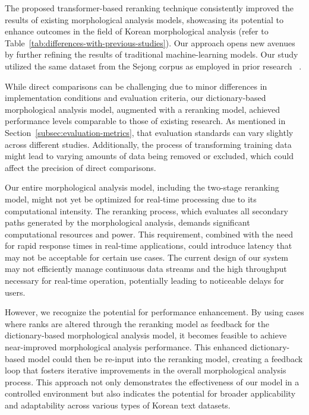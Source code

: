 \documentclass[AMS,STIX2COL]{WileyNJD-v2}
\begin{document}
    The proposed transformer-based reranking technique consistently improved the results of existing morphological analysis models, showcasing its potential to enhance outcomes in the field of Korean morphological analysis (refer to Table~\ref{tab:differences-with-previous-studies}).
    Our approach opens new avenues by further refining the results of traditional machine-learning models.
    Our study utilized the same dataset from the Sejong corpus as employed in prior research ~\cite{MinJW2019, MinJW2020, MinJW2022, MinJW2018, NaSH2015, NaSH2014, NaSH2018, SongHJ2019, SongHJ2020}.

    While direct comparisons can be challenging due to minor differences in implementation conditions and evaluation criteria, our dictionary-based morphological analysis model, augmented with a reranking model, achieved performance levels comparable to those of existing research.
    As mentioned in Section~\ref{subsec:evaluation-metrics}, that evaluation standards can vary slightly across different studies.
    Additionally, the process of transforming training data might lead to varying amounts of data being removed or excluded, which could affect the precision of direct comparisons.

    Our entire morphological analysis model, including the two-stage reranking model, might not yet be optimized for real-time processing due to its computational intensity.
    The reranking process, which evaluates all secondary paths generated by the morphological analysis, demands significant computational resources and power.
    This requirement, combined with the need for rapid response times in real-time applications, could introduce latency that may not be acceptable for certain use cases.
    The current design of our system may not efficiently manage continuous data streams and the high throughput necessary for real-time operation, potentially leading to noticeable delays for users.

    However, we recognize the potential for performance enhancement.
    By using cases where ranks are altered through the reranking model as feedback for the dictionary-based morphological analysis model, it becomes feasible to achieve near-improved morphological analysis performance.
    This enhanced dictionary-based model could then be re-input into the reranking model, creating a feedback loop that fosters iterative improvements in the overall morphological analysis process.
    This approach not only demonstrates the effectiveness of our model in a controlled environment but also indicates the potential for broader applicability and adaptability across various types of Korean text datasets.
\end{document}
